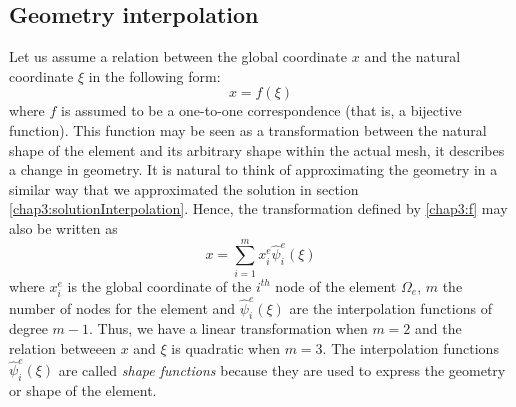 	
	\subsection{Geometry interpolation}
Let us assume a relation between the global coordinate $ x $ and the natural coordinate $ \xi $ in the following form:
\begin{equation}
\label{chap3:f}
x = f(\xi)
\end{equation}
where $ f $ is assumed to be a one-to-one correspondence (that is, a bijective function). This function may be seen as a transformation between the natural shape of the element and its arbitrary shape within the actual mesh, it describes a change in geometry. It is natural to think of approximating the geometry in a similar way that we approximated the solution in section \ref{chap3:solutionInterpolation}. Hence, the transformation defined by \eqref{chap3:f} may also be written as
\begin{equation}
\label{chap3:shapeFunctions}
x = \sum_{i=1}^m x_i^e \hat{\psi}_i^e(\xi)
\end{equation}
where $ x_i^e $ is the global coordinate of the $ i^{th} $ node of the element $ \Omega_e $, $ m $ the number of nodes for the element and $ \hat{\psi}_i^e(\xi) $ are the interpolation functions of degree $ m-1 $. Thus, we have a linear transformation when $ m = 2 $ and the relation betweeen $ x $ and $ \xi $ is quadratic when $ m=3 $. The interpolation functions $ \hat{\psi}_i^e(\xi) $ are called \emph{shape functions} because they are used to express the geometry or shape of the element. 

\bigskip

